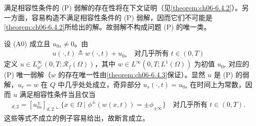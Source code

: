 \documentclass[../../main.tex]{subfiles}%
\begin{document}
\begin{remark}\label{remark:ch06-6.3.2}
满足相容性条件的 (P) 弱解的存在性将在下文证明（见\cref{theorem:ch06-6.4.2}）。另一方面，容易构造不满足相容性条件的 (P) 弱解，因而它们不可能是\cref{theorem:ch06-6.4.2}所给出的解。故弱解不构成问题 (P) 的唯一类。

设 (A0) 成立且 $u_{0s}\neq0$。由
\begin{align}
u(\cdot,t)\triangleq w(\cdot,t)+u_{0s} \quad\text{对几乎所有 }t\in(0,T) \label{align:ch6-6.22}
\end{align}
定义 $u\in L^\infty_{w^*}(0,T;\mathscr{R}_f(\Omega))$，其中 $w\in L^\infty(0,T;L^1(\Omega))$ 为初值 $u_{0r}$ 对应的 (P) 唯一弱解（$w$ 的存在唯一性由\cref{theorem:ch06-6.4.3}保证）。显然 $u$ 是 (P) 的弱解，$u_r=w$ 在 $Q$ 中几乎处处成立，奇异部分 $u_s(\cdot,t)=u_{0s}$ 在时间上为常数，因而 $u$ 满足相容性条件当且仅当
\begin{align*}
[u^\pm_{0s}]_{d,2}=[u^\pm_{0s}]_{d,2}\llcorner\{x\in\Omega\mid\phi^\pm(w(x,t))=\pm\phi_{\pm\infty}\}
\quad\text{对几乎所有 }t\in(0,T).
\end{align*}
这些等式不成立的例子容易给出，故断言成立。
\end{remark}
\end{document}
